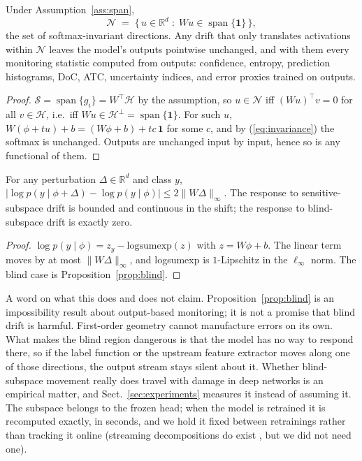 \documentclass[acmsmall,screen]{acmart}
\theoremstyle{acmdefinition}
\newcommand{\R}{\mathbb{R}}
\newcommand{\act}{\phi}
\DeclareMathOperator{\spn}{span}
\begin{document}
\begin{proposition}
\label{prop:blind}
Under Assumption~\ref{ass:span},
\[
  \mathcal{N} \;=\; \{\, u \in \R^d \;:\; Wu \in \spn\{\mathbf{1}\} \,\},
\]
the set of softmax-invariant directions. Any drift that only translates
activations within $\mathcal{N}$ leaves the model's outputs pointwise
unchanged, and with them every monitoring statistic computed from outputs:
confidence, entropy, prediction histograms, DoC, ATC, uncertainty indices,
and error proxies trained on outputs.
\end{proposition}

\begin{proof}
$\mathcal{S} = \spn\{g_i\} = W^\top\!\mathcal{H}$ by the assumption, so
$u \in \mathcal{N}$ iff $(Wu)^\top v = 0$ for all $v \in \mathcal{H}$, i.e.\
iff $Wu \in \mathcal{H}^\perp = \spn\{\mathbf{1}\}$. For such $u$,
$W(\act + tu) + b = (W\act + b) + tc\,\mathbf{1}$ for some $c$, and by
(\ref{eq:invariance}) the softmax is unchanged. Outputs are unchanged input
by input, hence so is any functional of them.
\end{proof}

\begin{proposition}[Calibrated response in the sensitive subspace]
\label{prop:bounded}
For any perturbation $\Delta \in \R^d$ and class $y$,
$\big|\log p(y \mid \act + \Delta) - \log p(y \mid \act)\big|
\le 2\lVert W\Delta \rVert_\infty$. The response to sensitive-subspace drift
is bounded and continuous in the shift; the response to blind-subspace drift
is exactly zero.
\end{proposition}

\begin{proof}
$\log p(y \mid \act) = z_y - \mathrm{logsumexp}(z)$ with $z = W\act + b$. The
linear term moves by at most $\lVert W\Delta\rVert_\infty$, and logsumexp is
$1$-Lipschitz in the $\ell_\infty$ norm. The blind case is
Proposition~\ref{prop:blind}.
\end{proof}

A word on what this does and does not claim.
Proposition~\ref{prop:blind} is an impossibility result about output-based
monitoring; it is not a promise that blind drift is harmful. First-order
geometry cannot manufacture errors on its own. What makes the blind region
dangerous is that the model has no way to respond there, so if the label
function or the upstream feature extractor moves along one of those
directions, the output stream stays silent about it. Whether blind-subspace
movement really does travel with damage in deep networks is an empirical
matter, and Sect.~\ref{sec:experiments} measures it instead of assuming it.
The subspace belongs to the frozen head; when the model is retrained it is
recomputed exactly, in seconds, and we hold it fixed between retrainings
rather than tracking it online (streaming decompositions do exist
\cite{halko2011structure}, but we did not need one).
\end{document}
